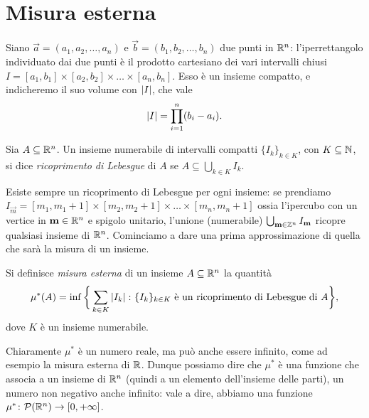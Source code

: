 \section{Misura esterna}
\label{sec:misura-esterna}
Siano $\vec a=(a_1,a_2,\dots,a_n)$ e $\vec b=(b_1,b_2,\dots,b_n)$ due punti in $\mathbb{R}^n$: l'iperrettangolo individuato dai due punti è il prodotto cartesiano dei vari intervalli chiusi $I=[a_1,b_1]\times[a_2,b_2]\times\dots\times[a_n,b_n]$.
Esso è un insieme compatto, e indicheremo il suo volume con $\left|{I}\right|$, che vale
\begin{equation*}
	\left|{I}\right|=\prod_{i=1}^n(b_i-a_i).
\end{equation*}
\begin{definizione} \label{d:ricoprimento-lebesgue}
	Sia $A\subseteq\mathbb{R}^n$.
	Un insieme numerabile di intervalli compatti $\{I_k\}_{k\in K}$, con $K\subseteq\mathbb{N}$, si dice \emph{ricoprimento di Lebesgue} di $A$ se $A\subseteq\bigcup_{k\in K}I_k$.
\end{definizione}
Esiste sempre un ricoprimento di Lebesgue per ogni insieme: se prendiamo $I_{\vec m}=[m_1,m_1+1]\times[m_2,m_2+1]\times\dots\times[m_n,m_n+1]$ ossia l'ipercubo con un vertice in $\mathbf{m}\in\mathbb{R}^n$ e spigolo unitario, l'unione (numerabile) $\bigcup_{\mathbf{m}\in\mathbb{Z}^n}I_{\mathbf{m}}$ ricopre qualsiasi insieme di $\mathbb{R}^n$.
Cominciamo a dare una prima approssimazione di quella che sarà la misura di un insieme.
\begin{definizione} \label{d:misura-esterna}
	Si definisce \emph{misura esterna} di un insieme $A\subseteq\mathbb{R}^n$ la quantità
	\begin{equation*}
		\mu^*(A)=\inf\bigg\{\sum_{k\in K}\left|{I_k}\right|\colon\{I_k\}_{k\in K}\text{ è un ricoprimento di Lebesgue di }A\bigg\},
	\end{equation*}
	dove $K$ è un insieme numerabile.
\end{definizione}
Chiaramente $\mu^*$ è un numero reale, ma può anche essere infinito, come ad esempio la misura esterna di $\mathbb{R}$.
Dunque possiamo dire che $\mu^*$ è una funzione che associa a un insieme di $\mathbb{R}^n$ (quindi a un elemento dell'insieme delle parti), un numero non negativo anche infinito: vale a dire, abbiamo una funzione $\mu^*\colon\mathcal P(\mathbb{R}^n)\to[0,+\infty]$.

